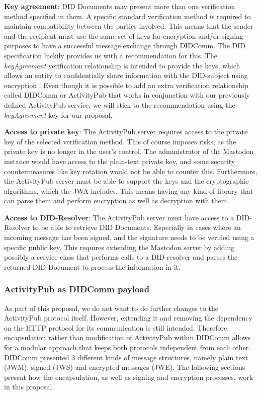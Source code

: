 \textbf{Key agreement}: DID Documents may present more than one verification method specified in them. A specific standard verification method is required to maintain compatibility between the parties involved. This means that the sender and the recipient must use the same set of keys for encryption and/or signing purposes to have a successful message exchange through DIDComm. The DID specification luckily provides us with a recommendation for this. The \emph{keyAgreement} verification relationship is intended to provide the keys, which allows an entity to confidentially share information with the DID-subject using encryption \cite{sporny_longley_sabadello_reed_steele_2021}. Even though it is possible to add an extra verification relationship called DIDComm or ActivityPub that works in conjunction with our previously defined ActivityPub service, we will stick to the recommendation using the \emph{keyAgreement} key for our proposal.

\textbf{Access to private key}: The ActivityPub server requires access to the private key of the selected verification method. This of course imposes risks, as the private key is no longer in the user's control. The administrator of the Mastodon instance would have access to the plain-text private key, and some security countermeasures like key rotation would not be able to counter this. Furthermore, the ActivityPub server must be able to support the keys and the cryptographic algorithms, which the JWA includes. This means having any kind of library that can parse them and perform encryption as well as decryption with them.

\textbf{Access to DID-Resolver}: The ActivityPub server must have access to a DID-Resolver to be able to retrieve DID Documents. Especially in cases where an incoming message has been signed, and the signature needs to be verified using a specific public key. This requires extending the Mastodon server by adding possibly a service class that performs calls to a DID-resolver and parses the returned DID Document to process the information in it. 

\subsubsection{ActivityPub as DIDComm payload}

As part of this proposal, we do not want to do further changes to the ActivityPub protocol itself. However, extending it and removing the dependency on the HTTP protocol for its communication is still intended. Therefore, encapsulation rather than modification of ActivityPub within DIDComm allows for a modular approach that keeps both protocols independent from each other. DIDComm presented 3 different kinds of message structures, namely plain text (JWM), signed (JWS) and encrypted messages (JWE). The following sections present how the encapsulation, as well as signing and encryption processes, work in this proposal.

